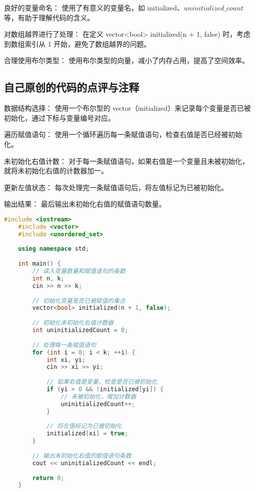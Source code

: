 良好的变量命名： 使用了有意义的变量名，如 initialized、$uninitialized\_count$ 等，有助于理解代码的含义。

对数组越界进行了处理： 在定义 vector<bool> initialized(n + 1, false) 时，考虑到数组索引从 1 开始，避免了数组越界的问题。

合理使用布尔类型： 使用布尔类型的向量，减小了内存占用，提高了空间效率。

\subsection{自己原创的代码的点评与注释}

数据结构选择： 使用一个布尔型的 vector（initialized）来记录每个变量是否已被初始化，通过下标与变量编号对应。

遍历赋值语句： 使用一个循环遍历每一条赋值语句，检查右值是否已经被初始化。

未初始化右值计数： 对于每一条赋值语句，如果右值是一个变量且未被初始化，就将未初始化右值的计数器加一。

更新左值状态： 每次处理完一条赋值语句后，将左值标记为已被初始化。

输出结果： 最后输出未初始化右值的赋值语句数量。

\begin{lstlisting}[language=C++]
    #include <iostream>
    #include <vector>
    #include <unordered_set>
    
    using namespace std;
    
    int main() {
        // 读入变量数量和赋值语句的条数
        int n, k;
        cin >> n >> k;
    
        // 初始化变量是否已被赋值的集合
        vector<bool> initialized(n + 1, false);
    
        // 初始化未初始化右值计数器
        int uninitializedCount = 0;
    
        // 处理每一条赋值语句
        for (int i = 0; i < k; ++i) {
            int xi, yi;
            cin >> xi >> yi;
    
            // 如果右值是变量，检查是否已被初始化
            if (yi > 0 && !initialized[yi]) {
                // 未被初始化，增加计数器
                uninitializedCount++;
            }
    
            // 将左值标记为已被初始化
            initialized[xi] = true;
        }
    
        // 输出未初始化右值的赋值语句条数
        cout << uninitializedCount << endl;
    
        return 0;
    }    
\end{lstlisting}